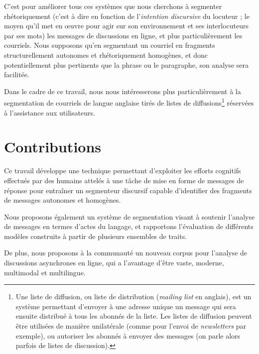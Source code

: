 C'est pour améliorer tous ces systèmes que nous cherchons à segmenter rhétoriquement (c'est à dire en fonction de l'\textit{intention discursive} du locuteur ; le moyen qu'il met en œuvre pour agir sur son environnement et ses interlocuteurs par ses mots) les messages de discussions en ligne, et plus particulièrement les courriels. Nous supposons qu'en segmentant un courriel en fragments structurellement autonomes et rhétoriquement homogènes, et donc potentiellement plus pertinents que la phrase ou le paragraphe, son analyse sera facilitée.

Dans le cadre de ce travail, nous nous intéresserons plus particulièrement à la segmentation de courriels de langue anglaise tirés de listes de diffusions\footnote{Une liste de diffusion, ou liste de distribution (\textit{mailing list} en anglais), est un système permettant d'envoyer à une adresse unique un message qui sera ensuite distribué à tous les abonnés de la liste. Les listes de diffusion peuvent être utilisées de manière unilatérale (comme pour l'envoi de \textit{newsletters} par exemple), ou autoriser les abonnés à envoyer des messages (on parle alors parfois de listes de discussion).} réservées à l'assistance aux utilisateurs.

\section{Contributions}

Ce travail développe une technique permettant d'exploiter les efforts cognitifs effectués par des humains attelés à une tâche de mise en forme de messages de réponse pour entraîner un segmenteur discursif capable d'identifier des fragments de messages autonomes et homogènes.

Nous proposons également un système de segmentation visant à soutenir l'analyse de messages en termes d'actes du langage, et rapportons l'évaluation de différents modèles construits à partir de plusieurs ensembles de traits.

De plus, nous proposons à la communauté un nouveau corpus pour l'analyse de discussions asynchrones en ligne, qui a l'avantage d'être vaste, moderne, multimodal et multilingue.